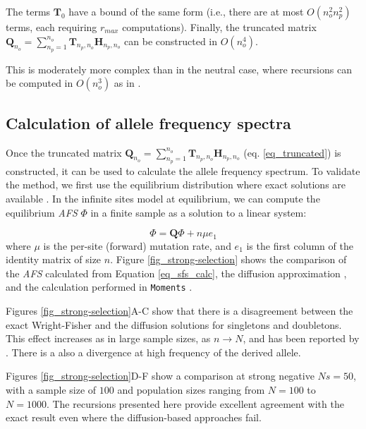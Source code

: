 \documentclass[review]{elsarticle}
\newcommand{\ra}{\rightarrow}
\newcommand{\sgcomment}[1]{{\color{red}{SG: #1}}}
\newcommand{\ikcomment}[1]{{\color{blue}{IK: #1}}}
\begin{document}
 
 The terms  $\mathbf{T}_{0}$ have a bound of the same form (i.e., there are at most $O(n_o^2 n_p^2)$ terms, each requiring $r_{max}$ computations).  
Finally, the truncated matrix $\mathbf{Q}_{n_o} = \sum_{n_p=1}^{n_{o}} \mathbf{T}_{n_p,n_o} \mathbf{H}_{n_p,n_o}$ can be constructed in $O(n_o^4)$.
\sgcomment{I think some of these $n_o$ might be $n_p$'s} \ikcomment{I think it's okay?}

This is moderately more complex than in the neutral case, where recursions can be computed in $O(n_o^3)$ as in \cite{BhaskarEtAl2014}.

\subsection{Calculation of allele frequency spectra}
\label{subsec_afs}

Once the truncated matrix
$\mathbf{Q}_{n_o} = \sum_{n_p=1}^{n_{o}} \mathbf{T}_{n_p,n_o} \mathbf{H}_{n_p,n_o}$
(eq. \ref{eq_truncated}) is constructed, it can be used to calculate the allele frequency spectrum. To
validate the method, we first use the equilibrium distribution where exact solutions are available
\citep{Krukov2016}. In the infinite sites model at equilibrium, we can compute the
equilibrium \textit{AFS} $\Phi$ in a finite sample as a solution to a linear system:

\begin{equation}
  \label{eq_sfs_calc}
  \Phi = \mathbf{Q}\Phi  + n \mu e_1
\end{equation}
where $\mu$ is the per-site (forward) mutation rate, and $e_1$ is the first column of the identity
matrix of size $n$. Figure \ref{fig_strong-selection} shows the comparison of the \textit{AFS}
calculated from Equation \ref{eq_sfs_calc}, the diffusion approximation
\cite[eq. 9.23]{Ewens2004}, and the calculation performed in \texttt{Moments}
\citep{JouganousEtAl2017}.

Figures \ref{fig_strong-selection}A-C show that there is a disagreement between the exact
Wright-Fisher and the diffusion solutions for singletons and doubletons. This effect increases as in
large sample sizes, as $n \ra N$, and has been reported by \citep{BhaskarEtAl2014}. There is a also
a divergence at high frequency of the derived allele. %

Figures \ref{fig_strong-selection}D-F show a comparison at strong negative $Ns=50$, with a
sample size of $100$ and population sizes ranging from $N=100$ to  $N=1000.$  
The recursions presented here provide excellent agreement with the exact result even 
where the diffusion-based approaches fail. 
\end{document}
